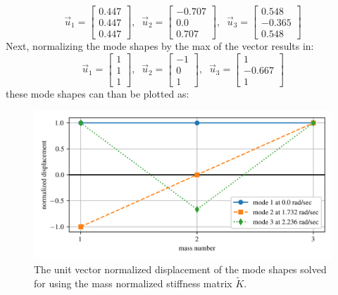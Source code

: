 \documentclass[12pt,letter]{article}
\begin{document}
\begin{example}
\begin{equation}
	\end{equation}
	\begin{equation}
	\vec{u}_1 = \begin{bmatrix} 0.447 \\   0.447 \\    0.447 \end{bmatrix}, \; \; \vec{u}_2 = \begin{bmatrix} -0.707 \\    0.0 \\    0.707 \end{bmatrix}, \; \; \vec{u}_3 = \begin{bmatrix} 0.548 \\    -0.365 \\    0.548  \end{bmatrix}
	\end{equation}
	Next, normalizing the mode shapes by the max of the vector results in:
	\begin{equation}
	\vec{u}_1 = \begin{bmatrix} 1 \\    1 \\    1  \end{bmatrix}, \; \; \vec{u}_2 = \begin{bmatrix} -1 \\    0 \\    1 \end{bmatrix}, \; \; \vec{u}_3 = \begin{bmatrix} 1 \\    -0.667 \\    1  \end{bmatrix}
	\end{equation}
	these mode shapes can than be plotted as:
	\begin{figure}[H]
		\centering
		\includegraphics[width=\linewidth]{../figures/mode_shape_aiplane_example_normalized_stiffness.png}
		\caption{The unit vector normalized displacement of the mode shapes solved for using the mass normalized stiffness matrix $\tilde{K}$.}
		\label{fig:mode_shape_aiplane_example_normalized_stiffness}
	\end{figure}
	

\end{example}
\end{document}
